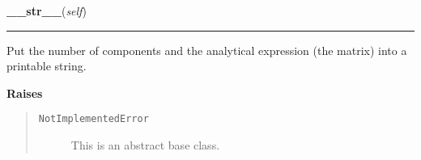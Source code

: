     \label{MatrixPotential:MatrixPotential:__str__}

    \vspace{0.5ex}

\hspace{.8\funcindent}\begin{boxedminipage}{\funcwidth}

    \raggedright \textbf{\_\_str\_\_}(\textit{self})

    \vspace{-1.5ex}

    \rule{\textwidth}{0.5\fboxrule}
\setlength{\parskip}{2ex}
    Put the number of components and the analytical expression (the matrix)
    into a printable string.

\setlength{\parskip}{1ex}
      \textbf{Raises}
    \vspace{-1ex}

      \begin{quote}
        \begin{description}

          \item[\texttt{NotImplementedError}]

          This is an abstract base class.

        \end{description}

      \end{quote}

    \end{boxedminipage}

    \label{MatrixPotential:MatrixPotential:get_number_components}

    \vspace{0.5ex}

